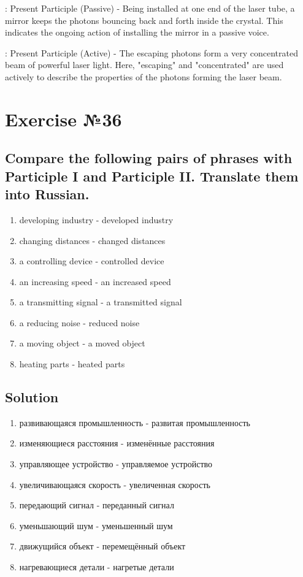 : Present Participle (Passive) - Being installed at one end of the laser tube, a mirror keeps the photons bouncing back and forth inside the crystal. This indicates the ongoing action of installing the mirror in a passive voice.

: Present Participle (Active) - The escaping photons form a very concentrated beam of powerful laser light. Here, "escaping" and "concentrated" are used actively to describe the properties of the photons forming the laser beam.

\section*{Exercise №36}
\subsection*{Compare the following pairs of phrases with Participle I and Participle II. Translate
      them into Russian.}
\begin{enumerate}
      \item developing industry - developed industry
      \item changing distances - changed distances
      \item a controlling device - controlled device
      \item an increasing speed - an increased speed
      \item a transmitting signal - a transmitted signal
      \item a reducing noise - reduced noise
      \item a moving object - a moved object
      \item heating parts - heated parts
\end{enumerate}

\subsection*{Solution}
\begin{enumerate}
      \item развивающаяся промышленность - развитая промышленность
      \item изменяющиеся расстояния - изменённые расстояния
      \item управляющее устройство - управляемое устройство
      \item увеличивающаяся скорость - увеличенная скорость
      \item передающий сигнал - переданный сигнал
      \item уменьшающий шум - уменьшенный шум
      \item движущийся объект - перемещённый объект
      \item нагревающиеся детали -  нагретые детали
\end{enumerate}

